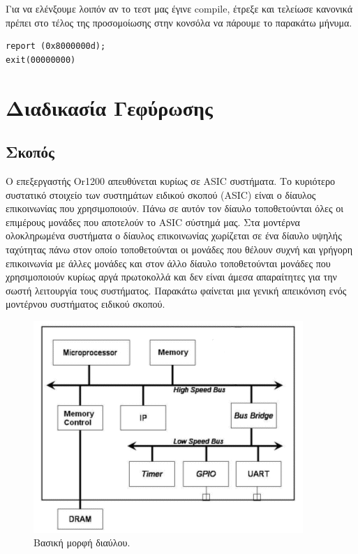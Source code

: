 \documentclass[a4paper,10pt]{article}
\numberwithin{figure}{section}
\numberwithin{table}{section}
\begin{document}
Για να ελένξουμε λοιπόν αν το τεστ μας έγινε compile, έτρεξε και τελείωσε κανονικά πρέπει στο τέλος της προσομοίωσης στην κονσόλα να πάρουμε το παρακάτω μήνυμα.
\newline

\begin{lstlisting}
report (0x8000000d);
exit(00000000)
\end{lstlisting}



\newpage
\newpage
\newpage

\section{Διαδικασία Γεφύρωσης}
\subsection{Σκοπός}


Ο επεξεργαστής Or1200 απευθύνεται κυρίως σε ASIC συστήματα. Το κυριότερο συστατικό στοιχείο των συστημάτων ειδικού σκοπού (ASIC) είναι ο δίαυλος επικοινωνίας που χρησιμοποιούν. Πάνω σε αυτόν τον δίαυλο τοποθετούνται όλες οι επιμέρους μονάδες που αποτελούν το ASIC σύστημά μας. Στα μοντέρνα ολοκληρωμένα συστήματα ο δίαυλος επικοινωνίας χωρίζεται σε ένα δίαυλο υψηλής ταχύτητας πάνω στον οποίο τοποθετούνται οι μονάδες που θέλουν συχνή και γρήγορη επικοινωνία με άλλες μονάδες και στον άλλο δίαυλο τοποθετούνται μονάδες που χρησιμοποιούν κυρίως αργά πρωτοκολλά και δεν είναι άμεσα απαραίτητες για την σωστή λειτουργία τους συστήματος. Παρακάτω φαίνεται μια γενική απεικόνιση ενός μοντέρνου συστήματος ειδικού σκοπού. 
\vspace{0.7cm}
\begin{figure}[h!]
 \centering
 \includegraphics[bb=0 0 386 304,scale=0.5]{./Images/ASIC_BUS.png}
 \caption{Βασική μορφή διαύλου.}
\end{figure}
\vspace{0.7cm}
\end{document}

